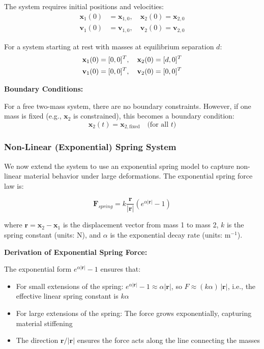 \documentclass[11pt,a4paper]{article}
\begin{document}
\noindent The system requires initial positions and velocities:
\begin{align}
\mathbf{x}_1(0) &= \mathbf{x}_{1,0}, \quad \mathbf{x}_2(0) = \mathbf{x}_{2,0} \\
\mathbf{v}_1(0) &= \mathbf{v}_{1,0}, \quad \mathbf{v}_2(0) = \mathbf{v}_{2,0}
\end{align}

\noindent For a system starting at rest with masses at equilibrium separation $d$:
\begin{align}
\mathbf{x}_1(0) &= [0, 0]^T, \quad \mathbf{x}_2(0) = [d, 0]^T \\
\mathbf{v}_1(0) &= [0, 0]^T, \quad \mathbf{v}_2(0) = [0, 0]^T \newline
\end{align}

\noindent \textbf{Boundary Conditions:}

\noindent For a free two-mass system, there are no boundary constraints. However, if one mass is fixed (e.g., $\mathbf{x}_2$ is constrained), this becomes a boundary condition:
\begin{equation}
\mathbf{x}_2(t) = \mathbf{x}_{2,\text{fixed}} \quad \text{(for all } t \text{)}
\end{equation}

\subsubsection{Non-Linear (Exponential) Spring System}

\noindent We now extend the system to use an exponential spring model to capture non-linear material behavior under large deformations. The exponential spring force law is:

\begin{equation}
\mathbf{F}_{spring} = k \frac{\mathbf{r}}{|\mathbf{r}|} \left( e^{\alpha |\mathbf{r}|} - 1 \right)
\label{eq:exponential_force}
\end{equation}

\noindent where $\mathbf{r} = \mathbf{x}_2 - \mathbf{x}_1$ is the displacement vector from mass 1 to mass 2, $k$ is the spring constant (units: N), and $\alpha$ is the exponential decay rate (units: m$^{-1}$). \newline

\noindent \textbf{Derivation of Exponential Spring Force:}

\noindent The exponential form $e^{\alpha |\mathbf{r}|} - 1$ ensures that:
\begin{itemize}
    \item For small extensions of the spring: $e^{\alpha |\mathbf{r}|} - 1 \approx \alpha |\mathbf{r}|$, so $F \approx (k \alpha)\,|\mathbf{r}|$, i.e., the effective linear spring constant is $k\alpha$
    \item For large extensions of the spring: The force grows exponentially, capturing material stiffening
    \item The direction $\mathbf{r}/|\mathbf{r}|$ ensures the force acts along the line connecting the masses \newline
\end{itemize}
\end{document}
